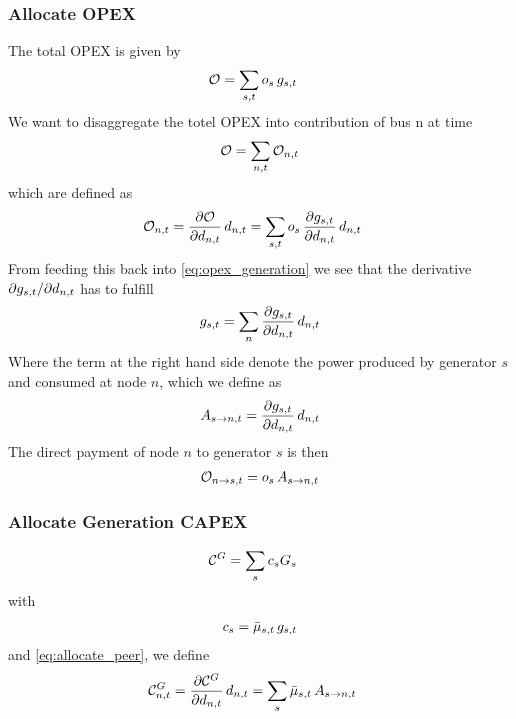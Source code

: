 \documentclass[a4paper,10pt]{article}
\begin{document}
\subsubsection*{Allocate OPEX}

The total OPEX is given by 
\begin{align}
 \totalOpexGeneration& = \sum_{s,t} \opexGeneration\,  \generation 
\label{eq:opex_generation}
 \end{align}
 We want to disaggregate the totel OPEX into contribution of bus n at time 
 \begin{align}
  \totalOpexGeneration = \sum_{n,t} \allocateOpex
 \end{align}
which are defined as 
\begin{align}
\allocateOpex  = \pdv{\totalOpexGeneration}{\demand} \, \demand & =  \sum_{s,t}\opexGeneration \, \pdv{\generation}{\demand} \, \demand
\end{align}
% 
From feeding this back into \cref{eq:opex_generation} we see that the derivative $\partial \generation / \partial \demand$ has to fulfill
\begin{align}
\generation = \sum_n \pdv{\generation}{\demand} \, \demand
\end{align}
Where the term at the right hand side denote the power produced by generator $s$ and consumed at node $n$, which we define as
\begin{align}
 \allocatePeer = \pdv{\generation}{\demand} \, \demand
 \label{eq:allocate_peer}
\end{align}
% 
The direct payment of node $n$ to generator $s$ is then  
% 
\begin{align}
 \allocateOpex[n \rightarrow s] &= 
\opexGeneration \,  \allocatePeer
\label{eq:allocate_opexGeneration_detailed}\\
\end{align}


\subsubsection*{Allocate Generation CAPEX}
\begin{align}
 \totalCapexGeneration& = \sum_{s} \capexGeneration \capacityGeneration 
\end{align}
with 
\begin{align}
 \capexGeneration = \muuppergeneration \, \generation
\end{align}
and \cref{eq:allocate_peer}, we define 
\begin{align}
\allocateCapexGeneration = \pdv{\totalCapexGeneration}{\demand} \, \demand & = \sum_{s} \muuppergeneration \, \allocatePeer
\end{align}
\end{document}
